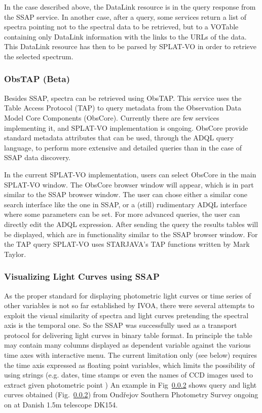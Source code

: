 \documentclass[final,authoryear,5p,times,twocolumn]{elsarticle}
\begin{document}
In the case described above, the DataLink resource is in the query
response from the SSAP service. In another case, after a query, some
services return a list of spectra pointing not to the spectral data to
be retrieved, but to a VOTable containing only DataLink information
with the links to the URLs of the data. This DataLink resource has
then to be parsed by SPLAT-VO in order to retrieve the selected spectrum.

\subsubsection{ObsTAP (Beta)}

Besides SSAP, spectra can be retrieved using ObsTAP. This service uses
the Table Access Protocol (TAP) to query metadata from the Observation
Data Model Core Components (ObsCore). Currently there are few services
implementing it, and SPLAT-VO implementation is ongoing.  ObsCore
provide standard metadata attributes that can be used, through the
ADQL query language, to perform more extensive and detailed queries
than in the case of SSAP data discovery.

In the current SPLAT-VO implementation, users can select ObsCore in the
main SPLAT-VO window. The ObsCore browser window will appear, which is in
part similar to the SSAP browser window. The user can chose either a
similar cone search interface like the one in SSAP, or a (still)
rudimentary ADQL interface where some parameters can be set. For more
advanced queries, the user can directly edit the ADQL
expression. After sending the query the results tables will be
displayed, which are in functionality similar to the SSAP browser
window. For the TAP query SPLAT-VO uses STARJAVA's TAP functions written
by Mark Taylor.


\subsubsection{Visualizing Light Curves using  SSAP}

As the proper standard for displaying photometric light curves or time
series of other variables is not so far established by IVOA, there were
several attempts to exploit the visual similarity of spectra and light
curves pretending the spectral axis is the temporal one.  So the SSAP
was successfully used as a transport protocol for delivering light
curves in binary table format. In principle the table may contain many
columns displayed as dependent variable against the various time axes
with interactive menu.  The current limitation only (see below)
requires the time axis expressed as floating point variables, which
limits the possibility of using strings (e.g. dates, time stamps or
even the names of CCD images used to extract given photometric point )
An example in Fig~\ref{} shows  query and light curves obtained  (Fig.~\ref{})  from
Ond\v{r}ejov Southern Photometry Survey \citep{adassxxiii} ongoing on  at Danish 1.5m telescope DK154.
\end{document}
